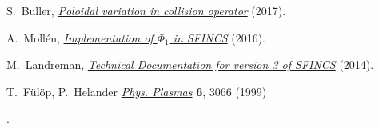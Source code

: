 \documentclass[12pt]{article}
\begin{document}

\newpage

\begin{thebibliography}{99}

 S.~Buller, \href{https://github.com/landreman/sfincs/blob/poloidalVariationInCollisionOperator/doc/poloidal_variation_in_collision_operator_2017-09-08.pdf}{ \em Poloidal variation in collision operator} (2017).

 A.~Moll\'en, \href{https://github.com/landreman/sfincs/blob/master/doc/Phi1_implementation_2016-01.pdf}{ \em Implementation of $\Phi_1$ in SFINCS} (2016).


 M.~Landreman, \href{https://github.com/landreman/sfincs/blob/poloidalVariationInCollisionOperator/doc/20150507-01\%20Technical\%20documentation\%20for\%20version\%203\%20of\%20SFINCS.pdf}{\em Technical Documentation for version 3 of SFINCS} (2014).

 T.~F\"{u}l\"{o}p, P.~Helander \href{http://aip.scitation.org/doi/abs/10.1063/1.873593}{\em Phys. Plasmas}{ \bf 6}, 3066 (1999) %

.

  



\end{thebibliography}
\end{document}
